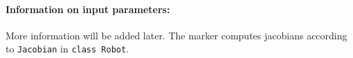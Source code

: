 \paragraph{Information on input parameters:} 
\finishTable
 \noindent
%    
%
    More information will be added later. The marker computes jacobians according to \texttt{Jacobian} in \texttt{class Robot}.

